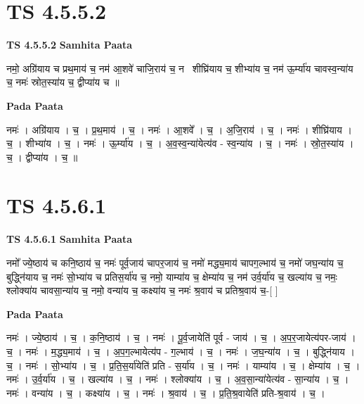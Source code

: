 \documentclass[17pt]{extarticle}
\begin{document}
\section*{ TS 4.5.5.2 }

\textbf{TS 4.5.5.2 } \newline
\textbf{Samhita Paata} \newline

नमो॒ अग्रि॑याय च प्रथ॒माय॑ च॒ नम॑ आ॒शवे॑ चाजि॒राय॑ च॒ नमः᳡शीघ्रि॑याय च॒ शीभ्या॑य च॒ नम॑ ऊ॒र्म्या॑य चावस्व॒न्या॑य च॒ नमः॑ स्रोत॒स्या॑य च॒ द्वीप्या॑य च ॥ \newline

\textbf{Pada Paata} \newline

नमः॑ । अग्रि॑याय । च॒ । प्र॒थ॒माय॑ । च॒ । नमः॑ । आ॒शवे᳚ । च॒ । अ॒जि॒राय॑ । च॒ । नमः॑ । शीघ्रि॑याय । च॒ । शीभ्या॑य । च॒ । नमः॑ । ऊ॒र्म्या॑य । च॒ । अ॒व॒स्व॒न्या॑येत्य॑व - स्व॒न्या॑य । च॒ । नमः॑ । स्रो॒त॒स्या॑य । च॒ । द्वीप्या॑य । च॒ ॥  \newline




\section*{ TS 4.5.6.1 }

\textbf{TS 4.5.6.1 } \newline
\textbf{Samhita Paata} \newline

नमो᳚ ज्ये॒ष्ठाय॑ च कनि॒ष्ठाय॑ च॒ नमः॑ पूर्व॒जाय॑ चापर॒जाय॑ च॒ नमो॑ मद्ध्य॒माय॑ चापग॒ल्भाय॑ च॒ नमो॑ जघ॒न्या॑य च॒ बुद्ध्नि॑याय च॒ नमः॑ सो॒भ्या॑य च प्रतिस॒र्या॑य च॒ नमो॒ याम्या॑य च॒ क्षेम्या॑य च॒ नम॑ उर्व॒र्या॑य च॒ खल्या॑य च॒ नमः॒ श्लोक्या॑य चावसा॒न्या॑य च॒ नमो॒ वन्या॑य च॒ कक्ष्या॑य च॒ नमः॑ श्र॒वाय॑ च प्रतिश्र॒वाय॑ च॒-[  ] \newline

\textbf{Pada Paata} \newline

नमः॑ । ज्ये॒ष्ठाय॑ । च॒ । क॒नि॒ष्ठाय॑ । च॒ । नमः॑ । पू॒र्व॒जायेति॑ पूर्व - जाय॑ । च॒ । अ॒प॒र॒जायेत्य॑पर-जाय॑ । च॒ । नमः॑ । म॒द्ध्य॒माय॑ । च॒ । अ॒प॒ग॒ल्भायेत्य॑प - ग॒ल्भाय॑ । च॒ । नमः॑ । ज॒घ॒न्या॑य । च॒ । बुद्ध्नि॑याय । च॒ । नमः॑ । सो॒भ्या॑य । च॒ । प्र॒ति॒स॒र्या॑येति॑ प्रति - स॒र्या॑य । च॒ । नमः॑ । याम्या॑य । च॒ । क्षेम्या॑य । च॒ । नमः॑ । उ॒र्व॒र्या॑य । च॒ । खल्या॑य । च॒ । नमः॑ । श्लोक्या॑य । च॒ । अ॒व॒सा॒न्या॑येत्य॑व - सा॒न्या॑य । च॒ । नमः॑ । वन्या॑य । च॒ । कक्ष्या॑य । च॒ । नमः॑ । श्र॒वाय॑ । च॒ । प्र॒ति॒श्र॒वायेति॑ प्रति-श्र॒वाय॑ । च॒ ।  \newline
\end{document}
